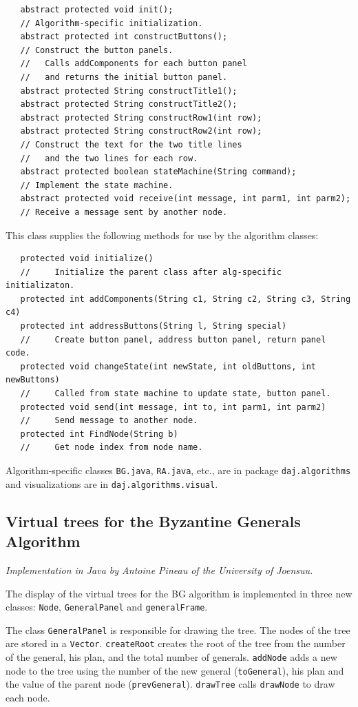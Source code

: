 \documentclass[11pt]{article}
\newcommand{\p}[1]{\texttt{#1}}
\begin{document}
\begin{verbatim}
   abstract protected void init();
   // Algorithm-specific initialization.
   abstract protected int constructButtons();
   // Construct the button panels.
   //   Calls addComponents for each button panel
   //   and returns the initial button panel.
   abstract protected String constructTitle1();
   abstract protected String constructTitle2();
   abstract protected String constructRow1(int row);
   abstract protected String constructRow2(int row);
   // Construct the text for the two title lines
   //   and the two lines for each row.
   abstract protected boolean stateMachine(String command);
   // Implement the state machine.
   abstract protected void receive(int message, int parm1, int parm2);
   // Receive a message sent by another node.
\end{verbatim}

This class supplies the following methods
for use by the algorithm classes:

\begin{verbatim}
   protected void initialize()
   //     Initialize the parent class after alg-specific initializaton.
   protected int addComponents(String c1, String c2, String c3, String c4)
   protected int addressButtons(String l, String special)
   //     Create button panel, address button panel, return panel code.
   protected void changeState(int newState, int oldButtons, int newButtons)
   //     Called from state machine to update state, button panel.
   protected void send(int message, int to, int parm1, int parm2)
   //     Send message to another node.
   protected int FindNode(String b)
   //     Get node index from node name.
\end{verbatim}

Algorithm-specific classes \p{BG.java}, \p{RA.java}, etc.,
are in package \p{daj.algorithms} and visualizations are in
\p{daj.algorithms.visual}.

\subsection{Virtual trees for the Byzantine Generals Algorithm}

\emph{Implementation in Java by Antoine Pineau of the University of Joensuu.}

The display of the virtual trees for the BG algorithm is
implemented in three new classes: \p{Node},
\p{GeneralPanel} and \p{generalFrame}.

The class \p{GeneralPanel} is responsible for drawing the tree.
The nodes of the tree are stored in a \p{Vector}.
\p{createRoot} creates the root of the tree from the number
of the general, his plan, and the total number of generals.
\p{addNode} adds a new node to the tree using the number
of the new general (\p{toGeneral}), his plan and the value of the
parent node (\p{prevGeneral}).
\p{drawTree} calls \p{drawNode}  to draw each node.
\end{document}
